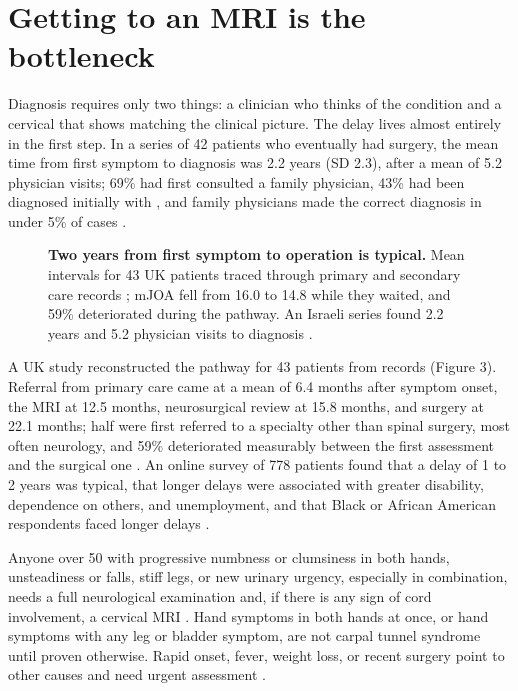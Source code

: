 \documentclass[11pt, letterpaper]{article}
\begin{document}
\section{Getting to an MRI is the bottleneck}

Diagnosis requires only two things: a clinician who thinks of the condition and a cervical  that shows  matching the clinical picture. The delay lives almost entirely in the first step. In a series of 42 patients who eventually had surgery, the mean time from first symptom to diagnosis was 2.2 years (SD 2.3), after a mean of 5.2 physician visits; 69\% had first consulted a family physician, 43\% had been diagnosed initially with , and family physicians made the correct diagnosis in under 5\% of cases \citep{behrbalk2013}.

\begin{figure}[!htb]
\centering

\caption{\textbf{Two years from first symptom to operation is typical.} Mean intervals for 43 UK patients traced through primary and secondary care records \citep{hilton2019}; mJOA fell from 16.0 to 14.8 while they waited, and 59\% deteriorated during the pathway. An Israeli series found 2.2 years and 5.2 physician visits to diagnosis \citep{behrbalk2013}.}
\end{figure}

A UK study reconstructed the pathway for 43 patients from records (Figure 3). Referral from primary care came at a mean of 6.4 months after symptom onset, the MRI at 12.5 months, neurosurgical review at 15.8 months, and surgery at 22.1 months; half were first referred to a specialty other than spinal surgery, most often neurology, and 59\% deteriorated measurably between the first assessment and the surgical one \citep{hilton2019}. An online survey of 778 patients found that a delay of 1 to 2 years was typical, that longer delays were associated with greater disability, dependence on others, and unemployment, and that Black or African American respondents faced longer delays \citep{pope2020delays}.

\begin{flag}
Anyone over 50 with progressive numbness or clumsiness in both hands, unsteadiness or falls, stiff legs, or new urinary urgency, especially in combination, needs a full neurological examination and, if there is any sign of cord involvement, a cervical MRI \citep{davies2018}. Hand symptoms in both hands at once, or hand symptoms with any leg or bladder symptom, are not carpal tunnel syndrome until proven otherwise. Rapid onset, fever, weight loss, or recent surgery point to other causes and need urgent assessment \citep{tetreault2022}.
\end{flag}
\end{document}
